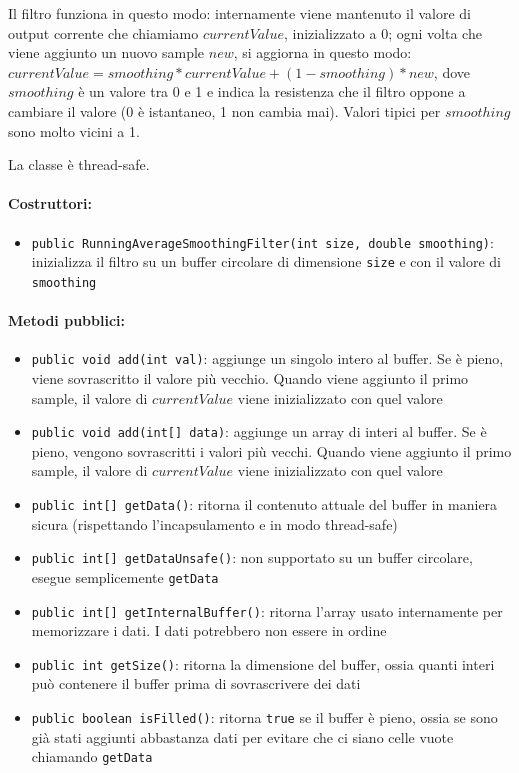 Il filtro funziona in questo modo: internamente viene mantenuto il valore di output corrente che chiamiamo $currentValue$, inizializzato a 0; ogni volta che viene aggiunto un nuovo sample $new$, si aggiorna in questo modo: $currentValue=smoothing*currentValue+(1-smoothing)*new$, dove $smoothing$ è un valore tra 0 e 1 e indica la resistenza che il filtro oppone a cambiare il valore (0 è istantaneo, 1 non cambia mai). Valori tipici per $smoothing$ sono molto vicini a 1.

La classe è thread-safe.

\paragraph{Costruttori:} \begin{itemize}
	\item \texttt{public RunningAverageSmoothingFilter(int size, double smoothing)}: inizializza il filtro su un buffer circolare di dimensione \texttt{size} e con il valore di \texttt{smoothing}
\end{itemize}

\paragraph{Metodi pubblici:} \begin{itemize}
	\item \texttt{public void add(int val)}: aggiunge un singolo intero al buffer. Se è pieno, viene sovrascritto il valore più vecchio. Quando viene aggiunto il primo sample, il valore di $currentValue$ viene inizializzato con quel valore
	\item \texttt{public void add(int[] data)}: aggiunge un array di interi al buffer. Se è pieno, vengono sovrascritti i valori più vecchi. Quando viene aggiunto il primo sample, il valore di $currentValue$ viene inizializzato con quel valore
	\item \texttt{public int[] getData()}: ritorna il contenuto attuale del buffer in maniera sicura (rispettando l'incapsulamento e in modo thread-safe)
	\item \texttt{public int[] getDataUnsafe()}: non supportato su un buffer circolare, esegue semplicemente \texttt{getData}
	\item \texttt{public int[] getInternalBuffer()}: ritorna l'array usato internamente per memorizzare i dati. I dati potrebbero non essere in ordine
	\item \texttt{public int getSize()}: ritorna la dimensione del buffer, ossia quanti interi può contenere il buffer prima di sovrascrivere dei dati
	\item \texttt{public boolean isFilled()}: ritorna \texttt{true} se il buffer è pieno, ossia se sono già stati aggiunti abbastanza dati per evitare che ci siano celle vuote chiamando \texttt{getData}
\end{itemize}

